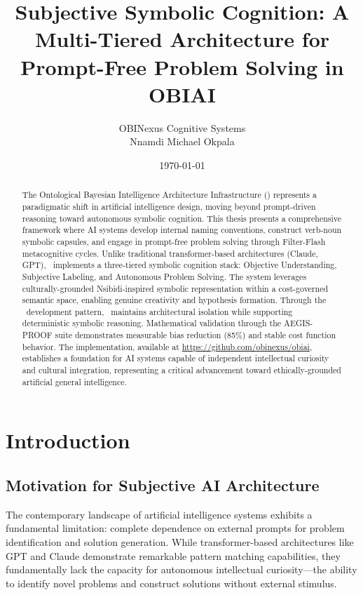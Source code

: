 \documentclass[12pt,twoside,openright]{report}
\title{Subjective Symbolic Cognition: A Multi-Tiered Architecture for Prompt-Free Problem Solving in OBIAI}
\author{OBINexus Cognitive Systems\\Nnamdi Michael Okpala}
\date{\today}
\begin{document}
\maketitle

\tableofcontents

\begin{abstract}
The Ontological Bayesian Intelligence Architecture Infrastructure (\obiai) represents a paradigmatic shift in artificial intelligence design, moving beyond prompt-driven reasoning toward autonomous symbolic cognition. This thesis presents a comprehensive framework where AI systems develop internal naming conventions, construct verb-noun symbolic capsules, and engage in prompt-free problem solving through Filter-Flash metacognitive cycles. Unlike traditional transformer-based architectures (Claude, GPT), \obiai\ implements a three-tiered symbolic cognition stack: Objective Understanding, Subjective Labeling, and Autonomous Problem Solving. The system leverages culturally-grounded Nsibidi-inspired symbolic representation within a cost-governed semantic space, enabling genuine creativity and hypothesis formation. Through the \sinphase\ development pattern, \obiai\ maintains architectural isolation while supporting deterministic symbolic reasoning. Mathematical validation through the AEGIS-PROOF suite demonstrates measurable bias reduction (85\%) and stable cost function behavior. The implementation, available at \url{https://github.com/obinexus/obiai}, establishes a foundation for AI systems capable of independent intellectual curiosity and cultural integration, representing a critical advancement toward ethically-grounded artificial general intelligence.
\end{abstract}

\chapter{Introduction}

\section{Motivation for Subjective AI Architecture}

The contemporary landscape of artificial intelligence systems exhibits a fundamental limitation: complete dependence on external prompts for problem identification and solution generation. While transformer-based architectures like GPT and Claude demonstrate remarkable pattern matching capabilities, they fundamentally lack the capacity for autonomous intellectual curiosity—the ability to identify novel problems and construct solutions without external stimulus.
\end{document}
